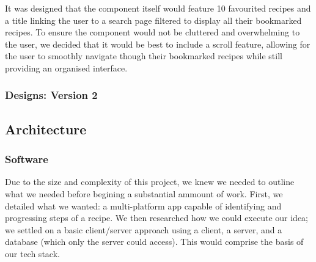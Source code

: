 \documentclass{article}
\begin{document}
It was designed that the component itself would feature 10 favourited recipes and a title linking the user to a search page filtered to display all their bookmarked recipes. To ensure the component would not be cluttered and overwhelming to the user, we decided that it would be best to include a scroll feature, allowing for the user to smoothly navigate though their bookmarked recipes while still providing an organised interface. 

    \subsubsection{Designs: Version 2}

    \subsection{Architecture}
    \subsubsection{Software}
    Due to the size and complexity of this project, we knew we needed to outline what we needed before begining a substantial ammount of work. First, we detailed what we wanted: a multi-platform app capable of identifying and progressing steps of a recipe. We then researched how we could execute our idea; we settled on a basic client/server approach using a client, a server, and a database (which only the server could access). This would comprise the basis of our tech stack.
\end{document}
